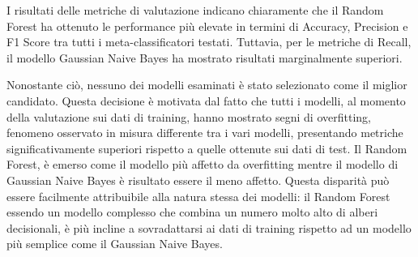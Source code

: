 \documentclass[../../Thesis.tex]{subfiles}
\begin{document}
\begin{table}[ht]
    \centering
    \caption{Confronto delle performance dei cinque modelli}
    \label{tab:comparison}
\end{table}
I risultati delle metriche di valutazione indicano chiaramente che il Random Forest ha ottenuto le performance pi\`u elevate in termini di Accuracy, Precision e F1 Score tra tutti i meta-classificatori testati. Tuttavia, per le metriche di Recall, il modello Gaussian Naive Bayes ha mostrato risultati marginalmente superiori.

Nonostante ci\`o, nessuno dei modelli esaminati \`e stato selezionato come il miglior candidato. Questa decisione \`e motivata dal fatto che tutti i modelli, al momento della valutazione sui dati di training, hanno mostrato segni di overfitting, fenomeno osservato in misura differente tra i vari modelli,  presentando metriche significativamente superiori rispetto a quelle ottenute sui dati di test. Il Random Forest, \`e emerso come il modello pi\`u affetto da overfitting mentre il modello di Gaussian Naive Bayes \`e risultato essere il meno affetto. Questa disparit\`a pu\`o essere facilmente attribuibile alla natura stessa dei modelli: il Random Forest essendo un modello complesso che combina un numero molto alto di alberi decisionali, \`e pi\`u incline a sovradattarsi ai dati di training rispetto ad un modello pi\`u semplice come il Gaussian Naive Bayes.\\
\end{document}
